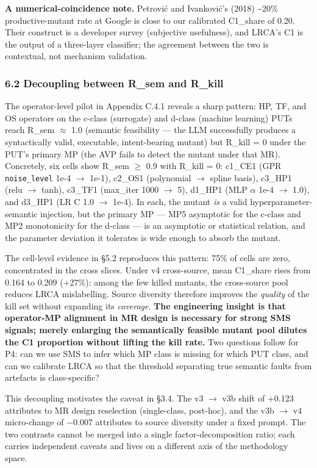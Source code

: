 \documentclass[review,12pt,authoryear]{elsarticle}
\begin{document}
\textbf{A numerical-coincidence note.} Petrović and Ivanković's (2018)
\textasciitilde20\% productive-mutant rate at Google is close to our
calibrated C1\_share of 0.20. Their construct is a developer survey
(subjective usefulness), and LRCA's C1 is the output of a three-layer
classifier; the agreement between the two is contextual, not mechanism
validation.

\subsubsection{6.2 Decoupling between R\_sem and
R\_kill}\label{decoupling-between-r_sem-and-r_kill}

The operator-level pilot in Appendix C.4.1 reveals a sharp pattern: HP,
TF, and OS operators on the c-class (surrogate) and d-class (machine
learning) PUTs reach R\_sem $\approx$ 1.0 (semantic feasibility --- the LLM
successfully produces a syntactically valid, executable, intent-bearing
mutant) but R\_kill = 0 under the PUT's primary MP (the AVP fails to
detect the mutant under that MR). Concretely, six cells show R\_sem $\geq$
0.9 with R\_kill = 0: c1\_CE1 (GPR \texttt{noise\_level} 1e-4 $\to$ 1e-1),
c2\_OS1 (polynomial $\to$ spline basis), c3\_HP1 (relu $\to$ tanh), c3\_TF1
(max\_iter 1000 $\to$ 5), d1\_HP1 (MLP $\alpha$ 1e-4 $\to$ 1.0), and d3\_HP1 (LR C 1.0
$\to$ 1e-4). In each, the mutant \emph{is} a valid hyperparameter-semantic
injection, but the primary MP --- MP5 asymptotic for the c-class and MP2
monotonicity for the d-class --- is an asymptotic or statistical
relation, and the parameter deviation it tolerates is wide enough to
absorb the mutant.

The cell-level evidence in §5.2 reproduces this pattern: 75\% of cells
are zero, concentrated in the cross slices. Under v4 cross-source, mean
C1\_share rises from 0.164 to 0.209 (+27\%): among the few killed
mutants, the cross-source pool reduces LRCA mislabelling. Source
diversity therefore improves the \emph{quality} of the kill set without
expanding its \emph{coverage}. \textbf{The engineering insight is that
operator-MP alignment in MR design is necessary for strong SMS signals;
merely enlarging the semantically feasible mutant pool dilutes the C1
proportion without lifting the kill rate.} Two questions follow for P4:
can we use SMS to infer which MP class is missing for which PUT class,
and can we calibrate LRCA so that the threshold separating true semantic
faults from artefacts is class-specific?

This decoupling motivates the caveat in §3.4. The v3 $\to$ v3b shift of
+0.123 attributes to MR design reselection (single-class, post-hoc), and
the v3b $\to$ v4 micro-change of −0.007 attributes to source diversity under
a fixed prompt. The two contrasts cannot be merged into a single
factor-decomposition ratio; each carries independent caveats and lives
on a different axis of the methodology space.
\end{document}
